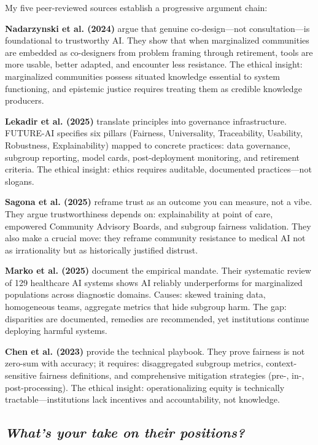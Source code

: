 \documentclass[12pt,a4paper]{article}
\begin{document}
My five peer-reviewed sources establish a progressive argument chain:

\textbf{Nadarzynski et al. (2024)} argue that genuine co-design—not consultation—is foundational to trustworthy AI. They show that when marginalized communities are embedded as co-designers from problem framing through retirement, tools are more usable, better adapted, and encounter less resistance. The ethical insight: marginalized communities possess situated knowledge essential to system functioning, and epistemic justice requires treating them as credible knowledge producers.\cite{nadarzynski2024}

\textbf{Lekadir et al. (2025)} translate principles into governance infrastructure. FUTURE-AI specifies six pillars (Fairness, Universality, Traceability, Usability, Robustness, Explainability) mapped to concrete practices: data governance, subgroup reporting, model cards, post-deployment monitoring, and retirement criteria. The ethical insight: ethics requires auditable, documented practices—not slogans.\cite{lekadir2025}

\textbf{Sagona et al. (2025)} reframe trust as an outcome you can measure, not a vibe. They argue trustworthiness depends on: explainability at point of care, empowered Community Advisory Boards, and subgroup fairness validation. They also make a crucial move: they reframe community resistance to medical AI not as irrationality but as historically justified distrust.\cite{sagona2025}

\textbf{Marko et al. (2025)} document the empirical mandate. Their systematic review of 129 healthcare AI systems shows AI reliably underperforms for marginalized populations across diagnostic domains. Causes: skewed training data, homogeneous teams, aggregate metrics that hide subgroup harm. The gap: disparities are documented, remedies are recommended, yet institutions continue deploying harmful systems.\cite{marko2025}

\textbf{Chen et al. (2023)} provide the technical playbook. They prove fairness is not zero-sum with accuracy; it requires: disaggregated subgroup metrics, context-sensitive fairness definitions, and comprehensive mitigation strategies (pre-, in-, post-processing). The ethical insight: operationalizing equity is technically tractable—institutions lack incentives and accountability, not knowledge.\cite{chen2023}

\subsection*{\textit{What's your take on their positions?}}
\end{document}
